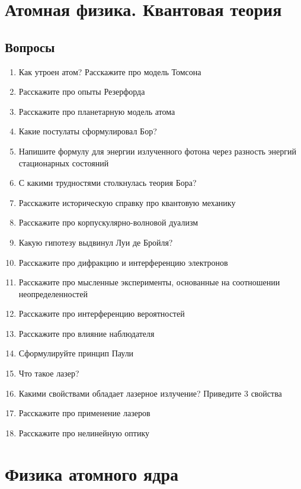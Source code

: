 \documentclass[12pt,a4paper]{report}
\begin{document}
\chapter{Атомная физика. Квантовая теория}
\section{Вопросы}
\begin{enumerate}
\item Как утроен атом? Расскажите про модель Томсона
\item Расскажите про опыты Резерфорда
\item Расскажите про планетарную модель атома
\item Какие постулаты сформулировал Бор?
\item Напишите формулу для энергии излученного фотона через разность энергий стационарных состояний
\item С какими трудностями столкнулась теория Бора?
\item Расскажите историческую справку про квантовую механику
\item Расскажите про корпускулярно-волновой дуализм
\item Какую гипотезу выдвинул Луи де Бройля?
\item Расскажите про дифракцию и интерференцию электронов
\item Расскажите про мысленные эксперименты, основанные на соотношении неопределенностей
\item Расскажите про интерференцию вероятностей
\item Расскажите про влияние наблюдателя
\item Сформулируйте принцип Паули
\item Что такое лазер?
\item Какими свойствами обладает лазерное излучение? Приведите 3 свойства
\item Расскажите про применение лазеров
\item Расскажите про нелинейную оптику
\end{enumerate}

\chapter{Физика атомного ядра}
\end{document}
